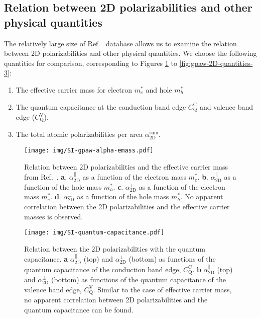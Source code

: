 \documentclass[journal=ancac3,email=true,hyperref=true,keywords=false]{achemso}
\begin{document}
\subsection{Relation between 2D polarizabilities and other physical quantities}
\label{sec:gpaw-3}

The relatively large size of Ref.~ database allows us
to examine the relation between 2D polarizabilities and other physical
quantities. We choose the following quantities for comparison,
corresponding to Figures \ref{fig:gpaw-2D-quantities-1} to
\ref{fig:gpaw-2D-quantities-3}:
\begin{enumerate}
\item The effective carrier mass for electron $m_{e}^{*}$ and hole $m_{h}^{*}$
  
\item The quantum capacitance at the conduction band edge
  $C_{\mathrm{Q}}^{\mathrm{C}}$ and valence band edge
  ($C_{\mathrm{Q}}^{\mathrm{V}}$).

  
\item The total atomic polarizabilities per area $\alpha_{\mathrm{2D}}^{\mathrm{sum}}$.
\end{enumerate}
\begin{figure}[htbp]
  \centering
  \texttt{[image: img/SI-gpaw-alpha-emass.pdf]}
  \caption{Relation between 2D polarizabilities and the effective
    carrier mass from Ref.~. 
    \textbf{a}. $\alpha_{\mathrm{2D}}^{\parallel}$ as a function of the
    electron mass $m_{e}^{*}$.  \textbf{b}. $\alpha_{\mathrm{2D}}^{\parallel}$ as a
    function of the hole mass
    $m_{h}^{*}$. \textbf{c}. $\alpha_{\mathrm{2D}}^{\perp}$ as a function of the
    electron mass $m_{e}^{*}$.  \textbf{d}. $\alpha_{\mathrm{2D}}^{\perp}$ as a
    function of the hole mass $m_{h}^{*}$. No apparent correlation
    between the 2D polarizabilities and the effective carrier masses
    is observed.}
  \label{fig:gpaw-2D-quantities-1}
\end{figure}

\begin{figure}[htbp]
  \centering
  \texttt{[image: img/SI-quantum-capacitance.pdf]}
  \caption{Relation between the 2D polarizabilities with the quantum
    capacitance. \textbf{a} $\alpha_{\mathrm{2D}}^{\parallel}$ (top) and
    $\alpha_{\mathrm{2D}}^{\perp}$ (bottom) as functions of the quantum capacitance
    of the conduction band edge,
    $C_{\mathrm{Q}}^{\mathrm{C}}$. \textbf{b} $\alpha_{\mathrm{2D}}^{\parallel}$
    (top) and $\alpha_{\mathrm{2D}}^{\perp}$ (bottom) as functions of the quantum
    capacitance of the valence band edge,
    $C_{\mathrm{Q}}^{\mathrm{V}}$. Similar to the case of effective
    carrier mass, no apparent correlation between 2D polarizabilities
    and the quantum capacitance can be found.}
  \label{fig:gpaw-2D-quantities-2}
\end{figure}
\end{document}

